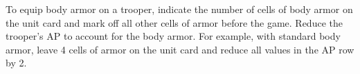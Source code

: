 To equip body armor on a trooper, indicate the number of cells of body armor on the unit card and mark off all other cells of armor before the game.
Reduce the trooper's AP to account for the body armor.
For example, with standard body armor, leave 4 cells of armor on the unit card and reduce all values in the AP row by 2.
